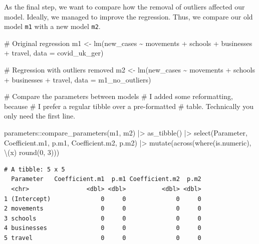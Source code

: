 \documentclass[
  letterpaper,
]{krantz}
\makeatletter
\newenvironment{Shaded}{\begin{snugshade}}{\end{snugshade}}
\newcommand{\AttributeTok}[1]{\textcolor[rgb]{0.40,0.45,0.13}{#1}}
\newcommand{\CommentTok}[1]{\textcolor[rgb]{0.37,0.37,0.37}{#1}}
\newcommand{\DecValTok}[1]{\textcolor[rgb]{0.68,0.00,0.00}{#1}}
\newcommand{\FunctionTok}[1]{\textcolor[rgb]{0.28,0.35,0.67}{#1}}
\newcommand{\NormalTok}[1]{\textcolor[rgb]{0.00,0.23,0.31}{#1}}
\newcommand{\OtherTok}[1]{\textcolor[rgb]{0.00,0.23,0.31}{#1}}
\newcommand{\SpecialCharTok}[1]{\textcolor[rgb]{0.37,0.37,0.37}{#1}}
\newenvironment{kframe}{%
\medskip{}
\setlength{\fboxsep}{.8em}
 \def\at@end@of@kframe{}%
 \ifinner\ifhmode%
  \def\at@end@of@kframe{\end{minipage}}%
  \begin{minipage}{\columnwidth}%
 \fi\fi%
 \def\FrameCommand##1{\hskip\@totalleftmargin \hskip-\fboxsep
 \colorbox{shadecolor}{##1}\hskip-\fboxsep
     \hskip-\linewidth \hskip-\@totalleftmargin \hskip\columnwidth}%
 \MakeFramed {\advance\hsize-\width
   \@totalleftmargin\z@ \linewidth\hsize
   \@setminipage}}%
 {\par\unskip\endMakeFramed%
 \at@end@of@kframe}
\renewenvironment{Shaded}{\begin{kframe}}{\end{kframe}}
\makeatother
\begin{document}
As the final step, we want to compare how the removal of outliers
affected our model. Ideally, we managed to improve the regression. Thus,
we compare our old model \texttt{m1} with a new model \texttt{m2}.

\begin{Shaded}
\begin{Highlighting}[]
\CommentTok{\# Original regression}
\NormalTok{m1 }\OtherTok{\textless{}{-}} \FunctionTok{lm}\NormalTok{(new\_cases }\SpecialCharTok{\textasciitilde{}}\NormalTok{ movements }\SpecialCharTok{+}\NormalTok{ schools }\SpecialCharTok{+}\NormalTok{ businesses }\SpecialCharTok{+}\NormalTok{ travel,}
         \AttributeTok{data =}\NormalTok{ covid\_uk\_ger)}

\CommentTok{\# Regression with outliers removed}
\NormalTok{m2 }\OtherTok{\textless{}{-}} \FunctionTok{lm}\NormalTok{(new\_cases }\SpecialCharTok{\textasciitilde{}}\NormalTok{ movements }\SpecialCharTok{+}\NormalTok{ schools }\SpecialCharTok{+}\NormalTok{ businesses }\SpecialCharTok{+}\NormalTok{ travel,}
         \AttributeTok{data =}\NormalTok{ m1\_no\_outliers)}

\CommentTok{\# Compare the parameters between models}
\CommentTok{\# I added some reformatting, because}
\CommentTok{\# I prefer a regular tibble over a pre{-}formatted}
\CommentTok{\# table. Technically you only need the first line.}

\NormalTok{parameters}\SpecialCharTok{::}\FunctionTok{compare\_parameters}\NormalTok{(m1, m2) }\SpecialCharTok{|\textgreater{}}
  \FunctionTok{as\_tibble}\NormalTok{() }\SpecialCharTok{|\textgreater{}}
  \FunctionTok{select}\NormalTok{(Parameter, Coefficient.m1, p.m1, Coefficient.m2, p.m2) }\SpecialCharTok{|\textgreater{}}
  \FunctionTok{mutate}\NormalTok{(}\FunctionTok{across}\NormalTok{(}\FunctionTok{where}\NormalTok{(is.numeric), \textbackslash{}(x) }\FunctionTok{round}\NormalTok{(}\DecValTok{0}\NormalTok{, }\DecValTok{3}\NormalTok{)))}
\end{Highlighting}
\end{Shaded}

\begin{verbatim}
# A tibble: 5 x 5
  Parameter   Coefficient.m1  p.m1 Coefficient.m2  p.m2
  <chr>                <dbl> <dbl>          <dbl> <dbl>
1 (Intercept)              0     0              0     0
2 movements                0     0              0     0
3 schools                  0     0              0     0
4 businesses               0     0              0     0
5 travel                   0     0              0     0
\end{verbatim}
\end{document}
